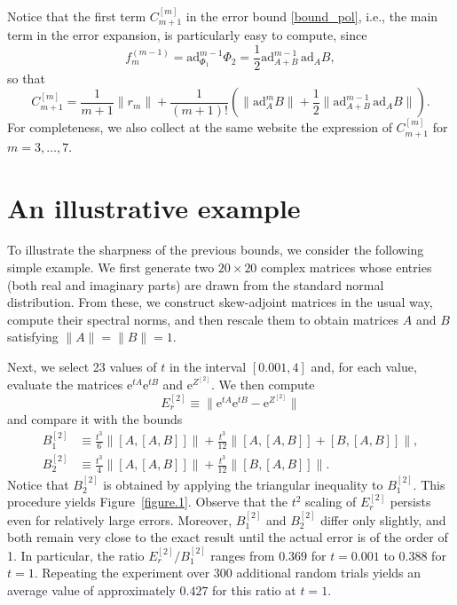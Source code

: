 \documentclass[11pt]{article}
\newcommand{\e}{\ensuremath{\mathrm{e}}}
\newcommand{\ad}{\ensuremath{\mathrm{ad}}}
\begin{document}
Notice that the first term $C_{m+1}^{[m]}$ in the error bound \eqref{bound_pol}, i.e., the main term in the error expansion, is particularly easy to compute, since 
\[
  f_{m}^{(m-1)} = \ad_{\Phi_1}^{m-1} \Phi_2 = \frac{1}{2} \ad_{A+B}^{m-1} \, \ad_A B,
\]  
so that
\[
  C_{m+1}^{[m]} = \frac{1}{m+1} \|r_m\| + \frac{1}{(m+1)!} \left( \| \ad_A^m B\| + \frac{1}{2} \|\ad_{A+B}^{m-1} \, \ad_A B\| \right).
\]
For completeness, we also collect at the same website the expression of $C_{m+1}^{[m]}$
for $m=3,\ldots,7$.

\section{An illustrative example}

To illustrate the sharpness of the previous bounds, we consider the following simple example. 
We first generate two $20 \times 20$ complex matrices whose entries (both real and imaginary parts) 
are drawn from the standard normal distribution. From these, we construct skew-adjoint matrices 
in the usual way, compute their spectral norms, and then rescale them to obtain matrices $A$ and $B$ 
satisfying $\|A\| = \|B\| = 1$.

Next, we select 23 values of $t$ in the interval $[0.001, 4]$ and, for each value, evaluate the matrices 
$\e^{tA}\e^{tB}$ and $\e^{Z^{[2]}}$. We then compute
\begin{equation} \label{act_err_2}
E_r^{[2]} \equiv \|\e^{tA}\e^{tB} - \e^{Z^{[2]}}\|
\end{equation}
and compare it with the bounds
\begin{equation} \label{bounds_2_3}
\begin{aligned}
  B_1^{[2]} &\equiv \frac{t^3}{6} \|[A,[A,B]] \| 
  + \frac{t^3}{12} \big\|[A,[A,B]] + [B,[A,B]]\big\|, \\
  B_2^{[2]} &\equiv \frac{t^3}{4} \|[A,[A,B]]\| 
  + \frac{t^3}{12} \|[B,[A,B]]\|.
\end{aligned}
\end{equation}
Notice that $B_2^{[2]}$ is obtained by applying the triangular inequality to $B_1^{[2]}$.
This procedure yields Figure~\ref{figure.1}. Observe that the $t^2$ scaling of $E_r^{[2]}$ 
persists even for relatively large errors. Moreover, $B_1^{[2]}$ and $B_2^{[2]}$ differ only slightly, 
and both remain very close to the exact result until the actual error is of the order of 1. In particular, 
the ratio $E_r^{[2]} / B_1^{[2]}$ ranges from $0.369$ for $t = 0.001$ to $0.388$ for $t = 1$. 
Repeating the experiment over 300 additional random trials yields an average value of approximately 
$0.427$ for this ratio at $t = 1$.
 
\end{document}
